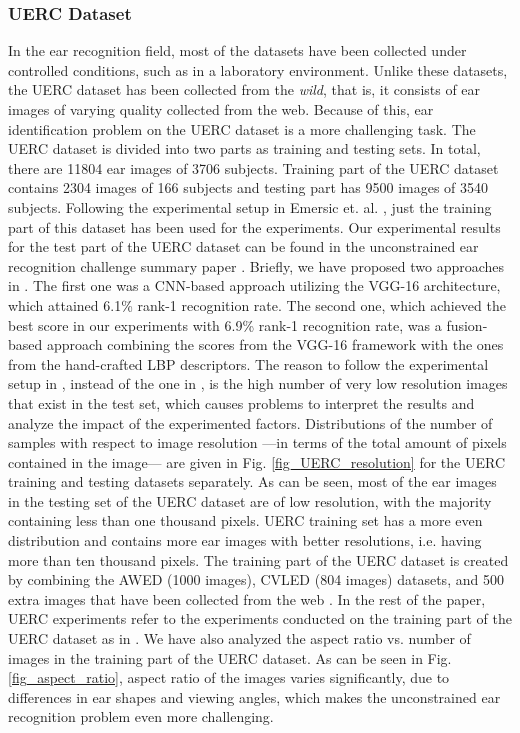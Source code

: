 \documentclass[11pt,journal,compsoc]{IEEEtran}
\begin{document}
\subsubsection{UERC Dataset} 
In the ear recognition field, most of the datasets have been collected under controlled conditions, such as in a laboratory environment. Unlike these datasets, the UERC dataset \cite{Emersic_2017_b} has been collected from the \textit{wild}, that is, it consists of ear images of varying quality collected from the web. Because of this, ear identification problem on the UERC dataset \cite{Emersic_2017_b} is a more challenging task. The UERC dataset is divided into two parts as training and testing sets. In total, there are 11804 ear images of 3706 subjects. Training part of the UERC dataset contains 2304 images of 166 subjects and testing part has 9500 images of 3540 subjects. Following the experimental setup in Emersic et. al. \cite{Emersic_2017_c}, just the training part of this dataset has been used for the experiments. Our experimental results for the test part of the UERC dataset can be found in the unconstrained ear recognition challenge summary paper \cite{Emersic_2017_b}. 
Briefly, we have proposed two approaches in \cite{Emersic_2017_b}. The first one was a CNN-based approach utilizing the VGG-16 architecture, which attained 6.1\% rank-1 recognition rate. The second one, which achieved the best score in our experiments with 6.9\% rank-1 recognition rate, was a fusion-based approach combining the scores from the VGG-16 framework with the ones from the hand-crafted LBP descriptors.
The reason to follow the experimental setup in \cite{Emersic_2017_c}, instead of the one in \cite{Emersic_2017_b}, is the high number of very low resolution images that exist in the test set, which causes problems to interpret the results and analyze the impact of the experimented factors. Distributions of the number of samples with respect to image resolution ---in terms of the total amount of pixels contained in the image--- are given in Fig. \ref{fig_UERC_resolution} for the UERC training and testing datasets separately. As can be seen, most of the ear images in the testing set of the UERC dataset are of low resolution, with the majority containing less than one thousand pixels. UERC training set has a more even distribution and contains more ear images with better resolutions, i.e. having more than ten thousand pixels. The training part of the UERC dataset is created by combining the AWED (1000 images), CVLED (804 images) datasets, and 500 extra images that have been collected from the web \cite{Emersic_2017_a,Emersic_2017_c}. In the rest of the paper, UERC experiments refer to the experiments conducted on the training part of the UERC dataset as in \cite{Emersic_2017_c}. We have also analyzed the aspect ratio vs. number of images in the training part of the UERC dataset. As can be seen in Fig. \ref{fig_aspect_ratio}, aspect ratio of the images varies significantly, due to differences in ear shapes and viewing angles, which makes the unconstrained ear recognition problem even more challenging.
\end{document}
